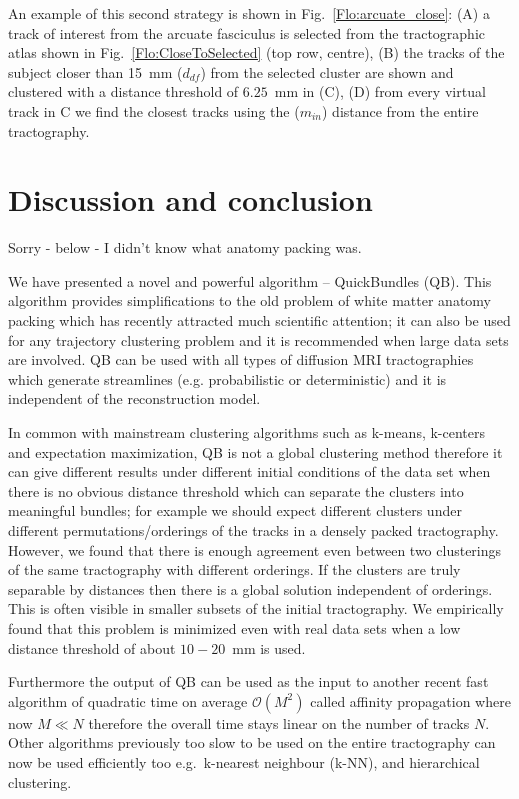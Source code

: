\documentclass[preprint,authoryear,a4paper,10pt,onecolumn]{elsarticle}
\begin{document}
An example of this second strategy is shown in
Fig.~\ref{Flo:arcuate_close}: (A) a track of interest from the arcuate
fasciculus is selected from the tractographic atlas shown in
Fig.~\ref{Flo:CloseToSelected} (top row, centre), (B) the tracks of the
subject closer than 15~mm ($d_{df}$) from the selected cluster are shown
and clustered with a distance threshold of $6.25$~mm in (C), (D) from
every virtual track in C we find the closest tracks using the
($m_{in}$) distance from the entire tractography.


\section{Discussion and conclusion}

\begin{matthewsays}
  Sorry - below - I didn't know what anatomy packing was.
\end{matthewsays}

We have presented a novel and powerful algorithm --
QuickBundles (QB). This algorithm provides simplifications to the old
problem of white matter anatomy packing which has recently attracted
much scientific attention; it can also be used for any trajectory
clustering problem and it is recommended when large data sets are
involved. QB can be used with all types of diffusion MRI tractographies
which generate streamlines (e.g. probabilistic or deterministic) and it
is independent of the reconstruction model.

In common with mainstream clustering algorithms such as k-means,
k-centers and expectation maximization, QB is not a global clustering
method therefore it can give different results under different initial
conditions of the data set when there is no obvious distance threshold
which can separate the clusters into meaningful bundles; for example we
should expect different clusters under different permutations/orderings
of the tracks in a densely packed tractography. However, we found that
there is enough agreement even between two clusterings of the same
tractography with different orderings. If the clusters are truly
separable by distances then there is a global solution independent of
orderings. This is often visible in smaller subsets of the initial
tractography. We empirically found that this problem is minimized even
with real data sets when a low distance threshold of about $10-20$~mm is
used.

Furthermore the output of QB can be used as the input to another recent
fast algorithm of quadratic time on average $\mathcal{O}(M^{2})$ called affinity
propagation where now $M\ll N$ therefore the overall time stays linear
on the number of tracks $N$. Other algorithms previously too slow to be
used on the entire tractography can now be used efficiently too
e.g.~k-nearest neighbour (k-NN), and hierarchical clustering.
\end{document}
